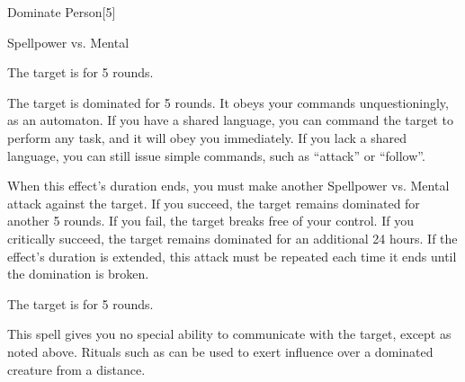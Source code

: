 \begin{spellsection}{Dominate Person}[5]
    \begin{spellheader}
    \end{spellheader}
    \begin{spellcontent}
        \begin{spelltargetinginfo}
        \end{spelltargetinginfo}
        \begin{spelleffects}
            \begin{spellattack}{Spellpower vs. Mental}

                \spellsuccess The target is \confused for 5 rounds.

                \spellcritical The target is dominated for 5 rounds. It obeys your commands unquestioningly, as an automaton. If you have a shared language, you can command the target to perform any task, and it will obey you immediately. If you lack a shared language, you can still issue simple commands, such as ``attack'' or ``follow''.

                When this effect's duration ends, you must make another Spellpower vs. Mental attack against the target. If you succeed, the target remains dominated for another 5 rounds. If you fail, the target breaks free of your control. If you critically succeed, the target remains dominated for an additional 24 hours. If the effect's duration is extended, this attack must be repeated each time it ends until the domination is broken.

                \spellfailure The target is \dazed for 5 rounds.
            \end{spellattack}
            \spelldur \durshort \dismissable
        \end{spelleffects}
    \end{spellcontent}
    \begin{spellfooter}
        \spellnotes This spell gives you no special ability to communicate with the target, except as noted above. Rituals such as  can be used to exert influence over a dominated creature from a distance.
        \miscastrandom
    \end{spellfooter}
\end{spellsection}

